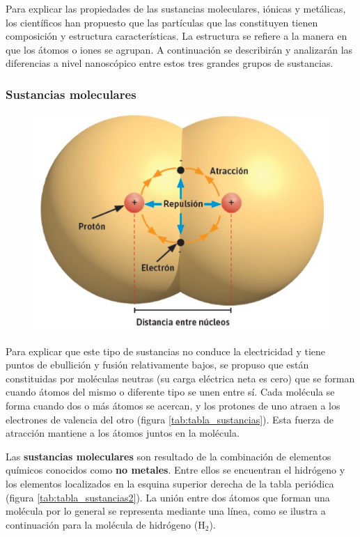 \documentclass[11pt]{book}
\begin{document}
Para explicar las propiedades de las sustancias moleculares, iónicas y metálicas, los científicos han propuesto
que las partículas que las constituyen tienen composición y estructura características. La estructura se refiere
a la manera en que los átomos o iones se agrupan. A continuación se describirán y analizarán las diferencias a
nivel nanoscópico entre estos tres grandes grupos de sustancias.



\subsubsection{Sustancias moleculares}

\begin{figure}[H]
  \centering
  \includegraphics[width=.5\textwidth]{atraccion_repulsion.png}
  \label{fig:atraccion_repulsion}
\end{figure}

Para explicar que este tipo de sustancias no conduce la electricidad y tiene puntos de
ebullición y fusión relativamente bajos, se propuso que están constituidas por moléculas
neutras (su carga eléctrica neta es cero) que se forman cuando átomos del mismo o diferente
tipo se unen entre sí. Cada molécula se forma cuando dos o más átomos se acercan, y los
protones de uno atraen a los electrones de valencia del otro (figura \ref{tab:tabla_sustancias}). Esta fuerza
de atracción mantiene a los átomos juntos en la molécula.

Las \textbf{sustancias moleculares} son resultado de la combinación de elementos químicos conocidos
como \textbf{no metales}. Entre ellos se encuentran el hidrógeno y los elementos localizados en la
esquina superior derecha de la tabla periódica (figura \ref{tab:tabla_sustancias2}).
La unión entre dos átomos que forman una molécula por lo general se representa mediante
una línea, como se ilustra a continuación para la molécula de hidrógeno (H$_2$).
\end{document}
